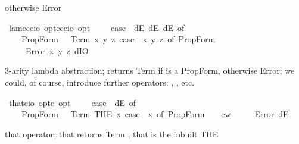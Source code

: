\begin{isabellebody}
\begin{isamarkuptext}
otherwise Error%
\end{isamarkuptext}%
\isamarkuptrue%
\isamarkupfalse%
\ lam{}{\isacharcolon}{\isacharcolon}{\isachardoublequoteopen}{\isacharparenleft}e{\isasymRightarrow}e{\isasymRightarrow}e{\isasymRightarrow}io\ opt{\isacharparenright}{\isasymRightarrow}{\isacharparenleft}e{\isasymRightarrow}e{\isasymRightarrow}e{\isasymRightarrow}io{\isacharparenright}\ opt{\isachardoublequoteclose}\ \ {\isachardoublequoteopen}{\isasymlambda}\ {\isasymPhi}\ {\isasymequiv}\ case\ {\isacharparenleft}{\isasymPhi}\ dE\ dE\ dE{\isacharparenright}\ of\isanewline
\ \ \ \ PropForm\ {\isasymphi}\ {\isasymRightarrow}\ Term\ {\isacharparenleft}{\isasymlambda}x\ y\ z{\isachardot}\ case\ {\isacharparenleft}{\isasymPhi}\ x\ y\ z{\isacharparenright}\ of\ PropForm\ {\isasymphi}\ {\isasymRightarrow}\ {\isasymphi}{\isacharparenright}\isanewline
\ \ {\isacharbar}\ {\isacharunderscore}\ {\isasymRightarrow}\ Error\ {\isacharparenleft}{\isasymlambda}x\ y\ z{\isachardot}\ dIO{\isacharparenright}{\isachardoublequoteclose}%
\begin{isamarkuptext}%
3-arity lambda abstraction;  returns Term  if \isa{{\isasymphi}} is a PropForm, 
otherwise Error; we could, of course, introduce further operators: , , etc.%
\end{isamarkuptext}%
\isamarkuptrue%
\isamarkupfalse%
\ that{\isacharcolon}{\isacharcolon}{\isachardoublequoteopen}{\isacharparenleft}e{\isasymRightarrow}io\ opt{\isacharparenright}{\isasymRightarrow}e\ opt{\isachardoublequoteclose}\ \ {\isachardoublequoteopen}{\isasymepsilon}\ {\isasymPhi}\ {\isasymequiv}\ case\ {\isacharparenleft}{\isasymPhi}\ dE{\isacharparenright}\ of\isanewline
\ \ \ \ PropForm\ {\isasymphi}\ {\isasymRightarrow}\ Term\ {\isacharparenleft}THE\ x{\isachardot}\ case\ {\isacharparenleft}{\isasymPhi}\ x{\isacharparenright}\ of\ PropForm\ {\isasympsi}\ {\isasymRightarrow}\ {\isasympsi}\ cw{\isacharparenright}\isanewline
\ \ {\isacharbar}\ {\isacharunderscore}\ {\isasymRightarrow}\ Error\ dE{\isachardoublequoteclose}%
\begin{isamarkuptext}%
that operator; that  returns Term , that is the inbuilt THE 

\end{isamarkuptext}
\end{isabellebody}
